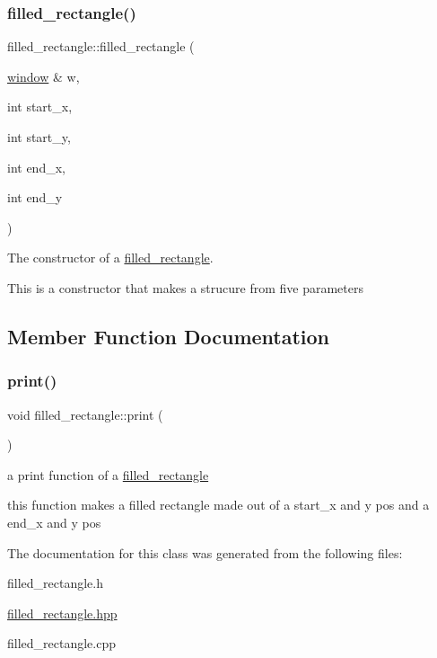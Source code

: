\subsubsection{\texorpdfstring{filled\+\_\+rectangle()}{filled\_rectangle()}}
{\footnotesize\ttfamily filled\+\_\+rectangle\+::filled\+\_\+rectangle (\begin{DoxyParamCaption}\item[{\hyperlink{classwindow}{window} \&}]{w,  }\item[{int}]{start\+\_\+x,  }\item[{int}]{start\+\_\+y,  }\item[{int}]{end\+\_\+x,  }\item[{int}]{end\+\_\+y }\end{DoxyParamCaption})\hspace{0.3cm}{\ttfamily [inline]}}



The constructor of a \hyperlink{classfilled__rectangle}{filled\+\_\+rectangle}. 

This is a constructor that makes a strucure from five parameters 

\subsection{Member Function Documentation}
\mbox{\label{classfilled__rectangle_aef5f2d6c5d83663512e78a581b400214}} 
\subsubsection{\texorpdfstring{print()}{print()}}
{\footnotesize\ttfamily void filled\+\_\+rectangle\+::print (\begin{DoxyParamCaption}{ }\end{DoxyParamCaption})}



a print function of a \hyperlink{classfilled__rectangle}{filled\+\_\+rectangle} 

this function makes a filled rectangle made out of a start\+\_\+x and y pos and a end\+\_\+x and y pos 

The documentation for this class was generated from the following files\+:\begin{DoxyCompactItemize}
\item 
filled\+\_\+rectangle.\+h\item 
\hyperlink{filled__rectangle_8hpp}{filled\+\_\+rectangle.\+hpp}\item 
filled\+\_\+rectangle.\+cpp\end{DoxyCompactItemize}
